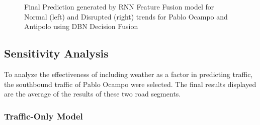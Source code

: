 \begin{figure}[!t]
  \centering
  \captionsetup{justification=centering}
  \caption{Final Prediction generated by RNN Feature Fusion model for Normal (left) and Disrupted (right) trends for Pablo Ocampo and Antipolo using DBN Decision Fusion}
  \label{fig:final_prediction}
\end{figure}































\subsection{Sensitivity Analysis}
To analyze the effectiveness of including weather as a factor in predicting traffic, the southbound traffic of Pablo Ocampo were selected. The final results displayed are the average of the results of these two road segments.

\subsubsection{Traffic-Only Model}

